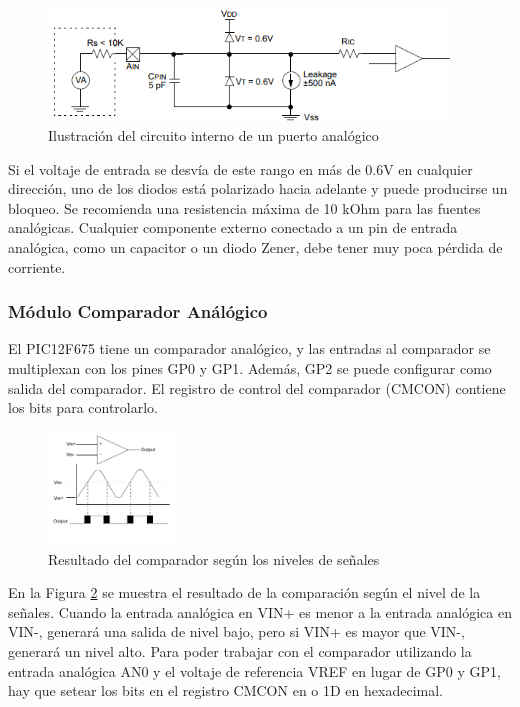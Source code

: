 \documentclass[a4paper]{article}
\begin{document}
\begin{figure}[h]\centering
    \includegraphics[height=3cm]{informefig4.png}
    \caption{Ilustración del circuito interno de un puerto analógico}
    \label{fig:analog-pin}
\end{figure}

Si el voltaje de entrada se desvía de este rango en más de 0.6V
en cualquier dirección, uno de los diodos está polarizado hacia adelante
y puede producirse un bloqueo. Se recomienda una resistencia máxima de 10 kOhm para las fuentes analógicas.
Cualquier componente externo conectado a un pin de entrada analógica,
como un capacitor o un diodo Zener, debe tener muy poca pérdida de corriente.

\subsubsection*{Módulo Comparador Análógico}

El PIC12F675 tiene un comparador analógico, y las entradas al
comparador se multiplexan con los pines GP0 y GP1.
Además, GP2 se puede configurar como salida del comparador.
El registro de control del comparador (CMCON) contiene
los bits para controlarlo.
		
\begin{figure}[h]\centering
    \includegraphics[height=3cm]{informefig3.png}
    \caption{Resultado del comparador según los niveles de señales}
    \label{fig:analog-signal}
\end{figure}

En la Figura \ref{fig:analog-signal} se muestra el resultado de la 
comparación según el nivel de la señales. Cuando la entrada 
analógica en VIN+ es menor a la entrada
analógica en VIN-, generará una salida de nivel bajo, pero si VIN+
es mayor que VIN-, generará un nivel alto.
Para poder trabajar con el comparador
utilizando la entrada analógica AN0 y el voltaje de referencia VREF 
en lugar de GP0 y GP1, hay que setear los bits en el registro CMCON 
en {} o {\ttfamily 1D} en hexadecimal.
\end{document}
